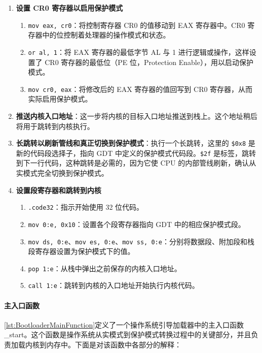 \begin{enumerate}
    \item \textbf{设置 CR0 寄存器以启用保护模式}
          \begin{enumerate}
              \item \texttt{mov eax, cr0}：将控制寄存器 CR0 的值移动到 EAX 寄存器中。CR0 寄存器中的位控制着处理器的操作模式和状态。
              \item \texttt{or al, 1}：将 EAX 寄存器的最低字节 AL 与 1 进行逻辑或操作，这样设置了 CR0 寄存器的最低位（PE 位，Protection Enable），用以启动保护模式。
              \item \texttt{mov cr0, eax}：将修改后的 EAX 寄存器的值回写到 CR0 寄存器，从而实际启用保护模式。
          \end{enumerate}
    \item \textbf{推送内核入口地址}：这一步将内核的目标入口地址推送到栈上。这个地址稍后将用于跳转到内核执行。
    \item \textbf{长跳转以刷新管线和真正切换到保护模式}：执行一个长跳转，这里的 \texttt{\$0x8} 是新的代码段选择子，指向 GDT 中定义的保护模式代码段。\texttt{\$2f} 是标签，跳转到下一行代码，这种跳转是必需的，因为它使 CPU 的内部管线刷新，确认从实模式完全切换到保护模式。
    \item \textbf{设置段寄存器和跳转到内核}
          \begin{enumerate}
              \item \texttt{.code32}：指示开始使用 32 位代码。
              \item \texttt{mov {0:e}, 0x10}：设置各个段寄存器指向 GDT 中的相应保护模式段。
              \item \texttt{mov ds, {0:e}}、\texttt{mov es, {0:e}}、\texttt{mov ss, {0:e}}：分别将数据段、附加段和栈段寄存器设置为保护模式下的值。
              \item \texttt{pop {1:e}}：从栈中弹出之前保存的内核入口地址。
              \item \texttt{call {1:e}}：跳转到内核的入口地址开始执行内核代码。
          \end{enumerate}
\end{enumerate}

\paragraph{主入口函数}

\cref{lst:BootloaderMainFunction}定义了一个操作系统引导加载器中的主入口函数 \_start。这个函数是操作系统从实模式到保护模式转换过程中的关键部分，并且负责加载内核到内存中。下面是对该函数中各部分的解释：


